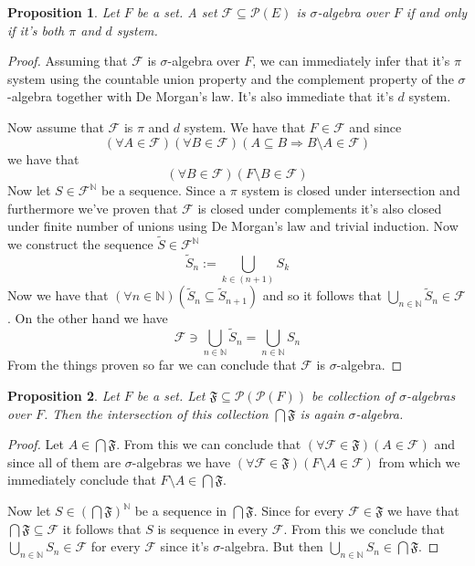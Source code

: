 \documentclass[a4paper]{amsart}
\newtheorem{prop}{Proposition}
\newcommand{\pow}[1]{\mathscr{P}\left(#1\right)}
\newcommand{\NN}{\mathbb{N}}
\begin{document}
\begin{prop}
    Let $F$ be a set. A set $\mathcal{F} \subseteq \pow{E}$ is 
    $\sigma$-algebra over $F$ if and only if it's both $\pi$ and 
    $d$ system.
\end{prop}

\begin{proof}
    Assuming that $\mathcal{F}$ is $\sigma$-algebra over $F$,
    we can immediately infer that it's $\pi$ system using the 
    countable union property and the complement property of 
    the $\sigma$-algebra together with De Morgan's law. It's 
    also immediate that it's $d$ system.
    
    Now assume that $\mathcal{F}$ is $\pi$ and $d$ system. We have that $F \in \mathcal{F}$
    and since
    $$\left(\forall A \in \mathcal{F}\right) \left(\forall B \in \mathcal{F}\right)
    \left( A \subseteq B \Longrightarrow B \setminus A \in\mathcal{F} \right)$$
    we have that
    $$\left(\forall B \in \mathcal{F}\right)  \left( F \setminus B \in \mathcal{F} \right)$$
    Now let $S\in \mathcal{F}^\NN$ be a sequence. 
    Since a $\pi$ system is closed under intersection and 
    furthermore we've proven that 
    $\mathcal{F}$ is closed under complements it's also 
    closed under finite number of unions using De Morgan's 
    law and trivial induction. Now we construct the sequence $\tilde{S}\in \mathcal{F}^\NN$
    $$
    \tilde{S}_n := \bigcup\limits_{k\in (n + 1)} S_k
    $$
    Now we have that 
    $ \left(\forall n \in \NN\right) \left( \tilde{S}_n  \subseteq \tilde{S}_{n+1} \right)$
    and so it follows that
    $\bigcup\limits_{n\in \NN} \tilde{S}_n \in \mathcal{F}$.
    On the other hand we have
    $$
    \mathcal{F} \ni \bigcup\limits_{n\in \NN} \tilde{S}_n = \bigcup\limits_{n\in \NN} S_n 
    $$
    From the things proven so far we can conclude that $\mathcal{F}$ is $\sigma$-algebra.
\end{proof}

\begin{prop}
    Let $F$ be a set. Let $\mathfrak{F} \subseteq \pow{\pow{F}}$ be collection of $\sigma$-algebras over $F$. Then the intersection of this collection $\bigcap \mathfrak{F}$ is again $\sigma$-algebra.
\end{prop}

\begin{proof}
    Let $A \in \bigcap \mathfrak{F}$. From this we can conclude that 
    $\left(\forall \mathcal{F} \in \mathfrak{F}\right) \left(A \in \mathcal{F}\right) $ and since all of them are $\sigma$-algebras we have $\left(\forall \mathcal{F} \in \mathfrak{F}\right) \left(F \setminus A \in \mathcal{F}\right)$ from which we immediately conclude that $F \setminus A \in \bigcap \mathfrak{F}$.
    
    Now let $S \in \left(\bigcap\mathfrak{F}\right)^\NN$ be a sequence in $\bigcap\mathfrak{F}$. Since for every $\mathcal{F} \in \mathfrak{F}$ we have that $\bigcap\mathfrak{F} \subseteq \mathcal{F}$ it follows that $S$ is sequence in every $\mathcal{F}$. From this we conclude that $\bigcup\limits_{n\in \NN} S_n \in \mathcal{F}$ for every $\mathcal{F}$ since it's $\sigma$-algebra. But then  $ \bigcup\limits_{n\in \NN} S_n \in  \bigcap \mathfrak{F}$.
\end{proof}
\end{document}
